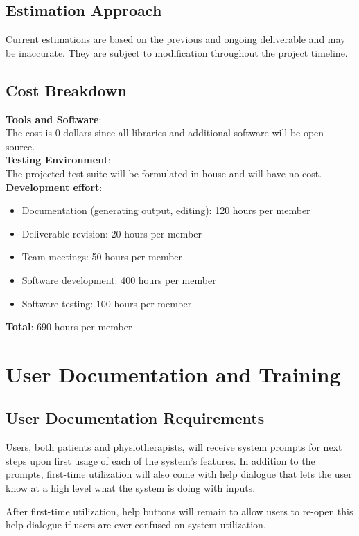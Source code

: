 \documentclass[12pt]{article}
\begin{document}
\subsection{Estimation Approach}
Current estimations are based on the previous and ongoing deliverable and may be inaccurate. They are subject to modification throughout the project timeline.

\subsection{Cost Breakdown}

\textbf{Tools and Software}:\\
The cost is 0 dollars since all libraries and additional software will be open source.\\
\textbf{Testing Environment}:\\
The projected test suite will be formulated in house and will have no cost. 
\textbf{Development effort}:\\
\begin{itemize}
  \item Documentation (generating output, editing): 120 hours per member
  \item Deliverable revision: 20 hours per member
  \item Team meetings: 50 hours per member
  \item Software development: 400 hours per member
  \item Software testing: 100 hours per member
\end{itemize}
\textbf{Total}: 690 hours per member 


\section{User Documentation and Training}
\subsection{User Documentation Requirements}
Users, both patients and physiotherapists, will receive system prompts for next steps upon first usage of each of the system’s features. In addition to the prompts, first-time utilization will also come with help dialogue that lets the user know at a high level what the system is doing with inputs.

After first-time utilization, help buttons will remain to allow users to re-open this help dialogue if users are ever confused on system utilization.
\end{document}
